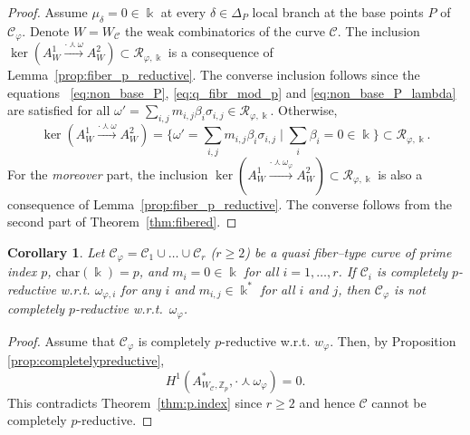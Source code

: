 \documentclass[11pt]{amsart}
\def\cC{\mathcal{C}}
\def\cR{{\mathcal R}}
\def\ZZ{\mathbb{Z}}
\def\kk{\Bbbk}
\def\w{\omega}
\theoremstyle{plain}
\newtheorem{corollary}[thm]{Corollary}
\theoremstyle{definition}
\begin{document}
\begin{proof}
Assume $\mu_\delta=0\in\kk$ at every $\delta\in\Delta_P$ local branch at the base points $P$ of $\cC_\varphi$. Denote $W=W_{\cC
}$ the weak combinatorics of the curve $\cC$. 
The inclusion $\ker(A^1_W \xrightarrow{\cdot\curlywedge\w} A^2_W)\subset \cR_{\varphi,\kk}$ is a consequence of Lemma~\ref{prop:fiber_p_reductive}. The converse inclusion follows since the equations ~\eqref{eq:non_base_P}, \eqref{eq:q_fibr_mod_p} and \eqref{eq:non_base_P_lambda} are satisfied for all $\w'= \sum_{i,j} m_{i,j}\beta_i\sigma_{i,j}\in\cR_{\varphi,\kk}$. Otherwise, 
$$\ker(A^1_W \xrightarrow{\cdot\curlywedge\w} A^2_W)= \bigg\{\w'=\sum_{i,j} m_{i,j}\beta_i\sigma_{i,j}\mid \sum_i\beta_i=0\in\kk \bigg\}\subset \cR_{\varphi,\kk }.$$
For the \emph{moreover} part, the inclusion $\ker(A^1_W \xrightarrow{\cdot\curlywedge\w_\varphi} A^2_W)\subset \cR_{\varphi,\kk}$ is also a consequence of Lemma~\ref{prop:fiber_p_reductive}.
The converse follows from the %
second part of Theorem~\ref{thm:fibered}.
\end{proof}

\begin{corollary}
\label{cor:C_not_p_reductive}
Let $\cC_\varphi= \cC_1 \cup \dots \cup \cC_r$ ($r\geq 2$) be a quasi fiber--type curve of prime index $p$, $\mathrm{char}(\kk)=p$, and $m_i=0\in\kk$ for all $i=1,\ldots,r$. If $\cC_i$ is completely $p$-reductive w.r.t. $\w_{\varphi,i}$ for any $i$ and $m_{i,j} \in \kk^*$ for all $i$ and $j$, then $\cC_\varphi$ is not completely $p$-reductive w.r.t.~$\w_\varphi$.
\end{corollary}
\begin{proof}
Assume that $\cC_\varphi$ is completely $p$-reductive w.r.t. $w_\varphi$. Then, by Proposition 
 \ref{prop:completelypreductive}, $$H^1(A^*_{W_\cC,\ZZ_p},\cdot\curlywedge\w_{\varphi}) = 0.$$ 
 This contradicts Theorem~\ref{thm:p.index} since $r \geq 2$ and hence $\cC$ cannot be completely $p$-reductive. 
\end{proof}
\end{document}
